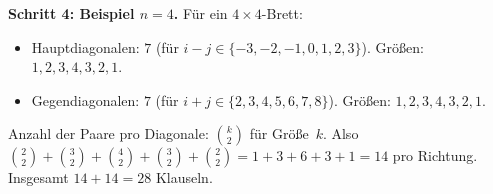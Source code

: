 \documentclass[a4paper,12pt]{article}
\begin{document}
\medskip
\textbf{Schritt 4: Beispiel $n = 4$.}
F\"ur ein $4 \times 4$-Brett:
\begin{itemize}[nosep]
\item Hauptdiagonalen: $7$ (f\"ur $i - j \in \{-3,-2,-1,0,1,2,3\}$).
      Gr\"o\ss en: $1, 2, 3, 4, 3, 2, 1$.
\item Gegendiagonalen: $7$ (f\"ur $i + j \in \{2,3,4,5,6,7,8\}$).
      Gr\"o\ss en: $1, 2, 3, 4, 3, 2, 1$.
\end{itemize}
Anzahl der Paare pro Diagonale: $\binom{k}{2}$ f\"ur Gr\"o\ss e~$k$.
Also $\binom{2}{2} + \binom{3}{2} + \binom{4}{2} + \binom{3}{2}
+ \binom{2}{2} = 1 + 3 + 6 + 3 + 1 = 14$ pro Richtung.
Insgesamt $14 + 14 = 28$ Klauseln.

\bigskip
\noindent{}
\end{document}
